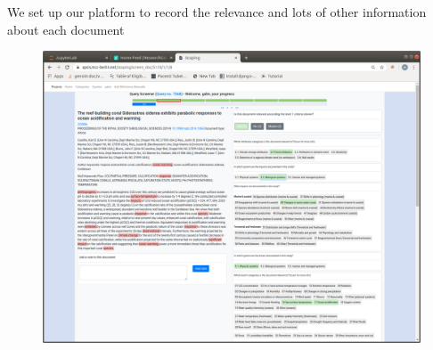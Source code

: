 \documentclass[9pt]{beamer}
\begin{document}
\begin{frame}{We set up our platform to record the relevance and lots of other information about each document}

\begin{figure}
	\includegraphics[width=\linewidth]{../plots/screening-platform}
\end{figure}

\end{frame}
\end{document}
